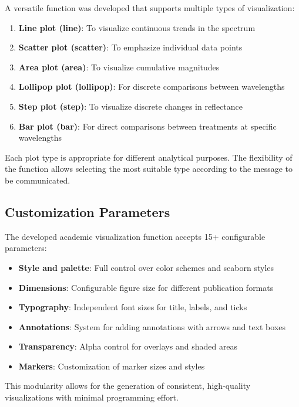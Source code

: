 \documentclass[12pt,a4paper]{article}
\begin{document}
A versatile function was developed that supports multiple types of visualization:

\begin{enumerate}
    \item \textbf{Line plot (line)}: To visualize continuous trends in the spectrum
    \item \textbf{Scatter plot (scatter)}: To emphasize individual data points
    \item \textbf{Area plot (area)}: To visualize cumulative magnitudes
    \item \textbf{Lollipop plot (lollipop)}: For discrete comparisons between wavelengths
    \item \textbf{Step plot (step)}: To visualize discrete changes in reflectance
    \item \textbf{Bar plot (bar)}: For direct comparisons between treatments at specific wavelengths
\end{enumerate}

Each plot type is appropriate for different analytical purposes. The flexibility of the function allows selecting the most suitable type according to the message to be communicated.

\subsection{Customization Parameters}

The developed academic visualization function accepts 15+ configurable parameters:

\begin{itemize}
    \item \textbf{Style and palette}: Full control over color schemes and seaborn styles
    \item \textbf{Dimensions}: Configurable figure size for different publication formats
    \item \textbf{Typography}: Independent font sizes for title, labels, and ticks
    \item \textbf{Annotations}: System for adding annotations with arrows and text boxes
    \item \textbf{Transparency}: Alpha control for overlays and shaded areas
    \item \textbf{Markers}: Customization of marker sizes and styles
\end{itemize}

This modularity allows for the generation of consistent, high-quality visualizations with minimal programming effort.
\end{document}
